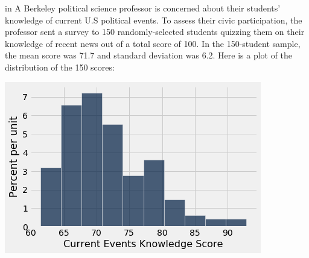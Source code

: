 in
A Berkeley political science professor is concerned about their students' knowledge of current U.S political events. To assess their civic participation, the professor sent a survey to 150 randomly-selected students quizzing them on their knowledge of recent news out of a total score of 100. In the 150-student sample, the mean score was 71.7 and standard deviation was 6.2. Here is a plot of the distribution of the 150 scores:

\begin{center}
\includegraphics[scale=.7]{figures/civic_hist.png}
\end{center}

